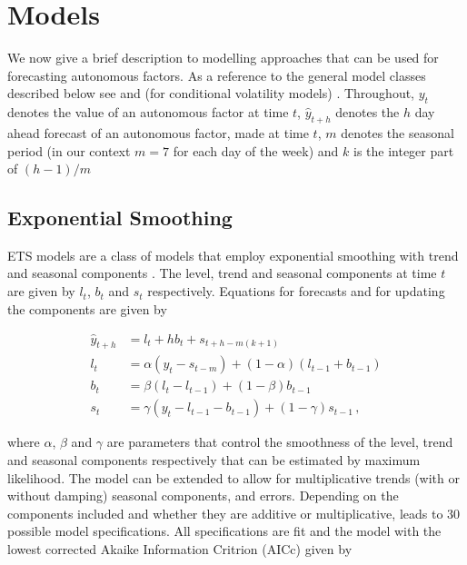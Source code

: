 \section{Models}\label{sec:models}

We now give a brief description to modelling approaches that can be used for forecasting autonomous factors. As a reference to the general model classes described below see \cite{HynAth2021} and (for conditional volatility models) \citet{Tsay2005}. Throughout, $y_t$ denotes the value of an autonomous factor at time $t$, $\hat{y}_{t+h}$ denotes the $h$ day ahead forecast of an autonomous factor, made at time $t$, $m$ denotes the seasonal period (in our context $m=7$ for each day of the week) and $k$ is the integer part of $(h-1)/m$



\subsection{Exponential Smoothing}

ETS models are a class of models that employ exponential smoothing with trend and seasonal components \citep[see][for details]{HynEtAl2008}. The level, trend and seasonal components at time $t$ are given by $l_t$, $b_t$ and $s_t$ respectively. Equations for forecasts and for updating the components are given by

\begin{align}
\hat{y}_{t+h}&=l_t+hb_t+s_{t+h-m(k+1)}\\
l_t&=\alpha (y_t-s_{t-m})+(1-\alpha)(l_{t-1}+{b_{t-1}})\\
b_t&=\beta (l_t-l_{t-1})+(1-\beta)b_{t-1}\\
s_t&=\gamma (y_t-l_{t-1}-b_{t-1})+(1-\gamma)s_{t-1}\,,
\end{align}

where $\alpha$, $\beta$ and $\gamma$ are parameters that control the smoothness of the level, trend and seasonal components respectively that can be estimated by maximum likelihood. The model can be extended to allow for  multiplicative trends (with or without damping) seasonal components, and errors. Depending on the components included and whether they are additive or multiplicative, leads to 30 possible model specifications. All specifications are fit and the model with the lowest corrected Akaike Information Critrion (AICc) given by

